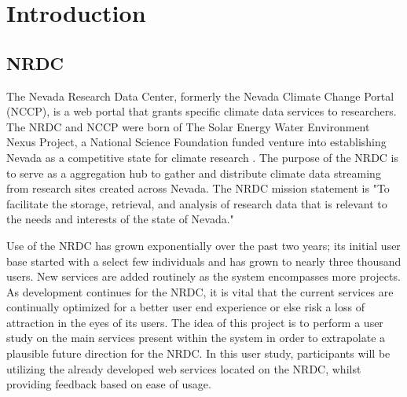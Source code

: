\documentclass{acm_proc_article-sp}
\begin{document}



%
%
\section{Introduction}
%
\subsection{NRDC}
The Nevada Research Data Center, formerly the Nevada Climate Change Portal (NCCP),  is a web portal that grants specific climate data services to researchers. The NRDC and NCCP were born of The Solar Energy Water Environment Nexus Project, a National Science Foundation funded venture into establishing Nevada as a competitive state for climate research \cite{nvsolarnexus.org}. The purpose of the NRDC is to serve as a aggregation hub to gather and distribute climate data streaming from research sites created across Nevada. The NRDC mission statement is "To facilitate the storage, retrieval, and analysis of research data that is relevant to the needs and interests of the state of Nevada." \cite{nccp,nrdc} 

Use of the NRDC has grown exponentially over the past two years; its initial user base started with a select few individuals and has grown to nearly three thousand users. New services are added routinely as the system encompasses more projects. As development continues for the NRDC, it is vital that the current services are continually optimized for a better user end experience or else risk a loss of attraction in the eyes of its users\cite{usability.gov}. The idea of this project is to perform a user study on the main services present within the system in order to extrapolate a plausible future direction for the NRDC. In this user study, participants will be utilizing the already developed web services located on the NRDC, whilst providing feedback based on ease of usage.
\end{document}
